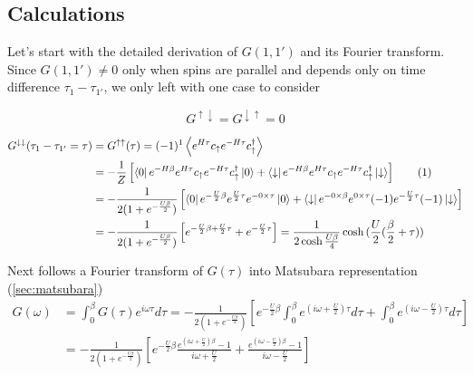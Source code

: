 \subsection{Calculations}
Let's start with the detailed derivation of $G(1,1')$ and its Fourier transform.
Since $G(1,1')\neq0$ only when spins are parallel and depends only on time difference $\tau_1-\tau_{1'}$, we only left with one case to consider

\begin{equation}
 G^{\uparrow\downarrow} = G^{\downarrow\uparrow} = 0
\end{equation}

\begin{align*}
 \label{Gamma2}
 \stepcounter{equation}
 G^{\downarrow\downarrow}(\tau_1-\tau_{1'}=\tau) & = G^{\uparrow\uparrow}(\tau) = (-1)^1\left\langle e^{H\tau} c_\uparrow e^{-H\tau} c_\uparrow^\dagger\right\rangle \\
  & = 
  -\frac{1}{Z}\left[
    \bra{0}e^{-H\beta}e^{H\tau}c_\uparrow e^{-H\tau} c_\uparrow^\dagger\ket{0} +
    \bra{\downarrow}e^{-H\beta}e^{H\tau}c_\uparrow e^{-H\tau} c_\uparrow^\dagger\ket{\downarrow}
  \right] \tag{\theequation} \\
  & = -\frac{1}{2(1+e^{-\frac{U\beta}{2}})}\left[ 
    \bra{0}e^{-\frac{U}{2}\beta}e^{\frac{U}{2}\tau}e^{-0\times\tau}\ket{0} +
    \bra{\downarrow}e^{-0\times\beta}e^{0\times\tau}(-1)e^{-\frac{U}{2}\tau}(-1)\ket{\downarrow}
  \right] \\
  & = -\frac{1}{2(1+e^{-\frac{U\beta}{2}})}\left[
    e^{-\frac{U}{2}\beta+\frac{U}{2}\tau} + e^{-\frac{U}{2}\tau}
  \right] = \frac{1}{2\cosh{\frac{U\beta}{4}}}\cosh{(\frac{U}{2}(\frac{\beta}{2}+\tau))}
\end{align*}

Next follows a Fourier transform of $G(\tau)$ into Matsubara representation (\autoref{sec:matsubara}) 
\begin{equation}\begin{aligned}
 G(\omega) & = \int_0^\beta G(\tau) e^{i\omega\tau} d\tau
  = -\frac{1}{2(1+e^{-\frac{U\beta}{2}})}\left[ 
    e^{-\frac{U}{2}\beta}\int_0^\beta  e^{(i\omega+\frac{U}{2})\tau} d\tau + \int_0^\beta  e^{(i\omega-\frac{U}{2})\tau} d\tau
  \right] \\
 & = -\frac{1}{2(1+e^{-\frac{U\beta}{2}})}\left[
    e^{-\frac{U}{2}\beta} \frac{e^{(i\omega+\frac{U}{2})\beta}-1}{i\omega+\frac{U}{2}} + \frac{e^{(i\omega-\frac{U}{2})\beta}-1}{i\omega-\frac{U}{2}}
  \right]
\end{aligned}\end{equation}

